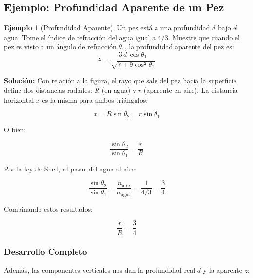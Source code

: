 \documentclass[12pt, a4paper]{article}
\theoremstyle{definition}
\newtheorem{ejemplo}{Ejemplo}[section]
\begin{document}
\subsection{Ejemplo: Profundidad Aparente de un Pez}
\label{sec:profundidad_aparente}

\begin{ejemplo}[Profundidad Aparente]
Un pez está a una profundidad \(d\) bajo el agua. Tome el índice de refracción del agua igual a
\(4/3\). Muestre que cuando el pez es visto a un ángulo de refracción \(\theta_1\), la
profundidad aparente del pez es:
\begin{equation}
  z = \frac{3\,d\,\cos\theta_1}{\sqrt{7 + 9\cos^2\theta_1}}
  \label{eq:profundidad_aparente}
\end{equation}
\end{ejemplo}

\textbf{Solución:} Con relación a la figura, el rayo que sale del pez hacia la superficie
define dos distancias radiales: \(R\) (en agua) y \(r\) (aparente en aire). La distancia
horizontal \(x\) es la misma para ambos triángulos:

\begin{equation}
  x = R\sin\theta_2 = r\sin\theta_1
  \label{eq:distancia_horizontal}
\end{equation}

O bien:

\begin{equation}
  \frac{\sin\theta_2}{\sin\theta_1} = \frac{r}{R}
  \label{eq:razon_senos}
\end{equation}

Por la ley de Snell, al pasar del agua al aire:

\begin{equation}
  \frac{\sin\theta_2}{\sin\theta_1} = \frac{n_{\text{aire}}}{n_{\text{agua}}} =
  \frac{1}{4/3} = \frac{3}{4}
  \label{eq:snell_agua_aire}
\end{equation}

Combinando estos resultados:

\begin{equation}
  \frac{r}{R} = \frac{3}{4}
  \label{eq:r_R}
\end{equation}

\subsubsection*{Desarrollo Completo}

Además, las componentes verticales nos dan la profundidad real \(d\) y la aparente \(z\):
\end{document}

